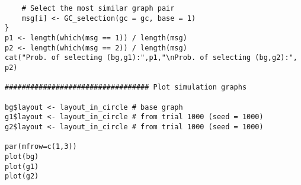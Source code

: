 {\begin{lstlisting}
	# Select the most similar graph pair
	msg[i] <- GC_selection(gc = gc, base = 1)
}
p1 <- length(which(msg == 1)) / length(msg)
p2 <- length(which(msg == 2)) / length(msg)
cat("Prob. of selecting (bg,g1):",p1,"\nProb. of selecting (bg,g2):", p2)

################################## Plot simulation graphs

bg$layout <- layout_in_circle # base graph
g1$layout <- layout_in_circle # from trial 1000 (seed = 1000)
g2$layout <- layout_in_circle # from trial 1000 (seed = 1000)

par(mfrow=c(1,3))
plot(bg)
plot(g1)
plot(g2)
\end{lstlisting}
}
